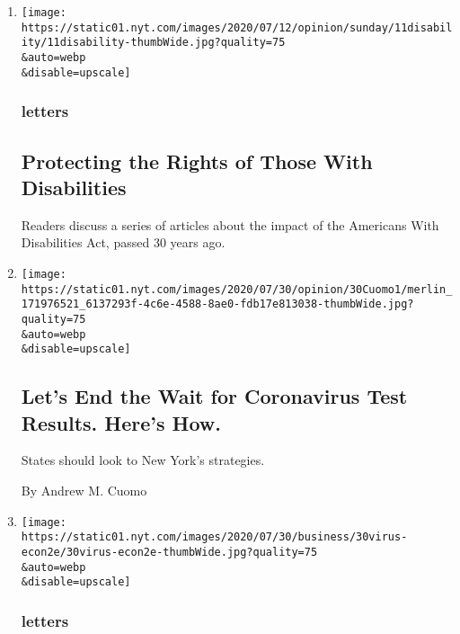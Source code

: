\begin{enumerate}
\def\labelenumi{\arabic{enumi}.}
\item
  \href{/2020/08/01/opinion/letters/disability-law.html}{}

  \texttt{[image: https://static01.nyt.com/images/2020/07/12/opinion/sunday/11disability/11disability-thumbWide.jpg?quality=75\\\&auto=webp\\\&disable=upscale]}

  \hypertarget{letters}{%
  \subsubsection{letters}\label{letters}}

  \hypertarget{protecting-the-rights-of-those-with-disabilities}{%
  \subsection{Protecting the Rights of Those With
  Disabilities}\label{protecting-the-rights-of-those-with-disabilities}}

  Readers discuss a series of articles about the impact of the Americans
  With Disabilities Act, passed 30 years ago.
\item
  \href{/2020/07/31/opinion/coronavirus-testing-cuomo.html}{}

  \texttt{[image: https://static01.nyt.com/images/2020/07/30/opinion/30Cuomo1/merlin\_171976521\_6137293f-4c6e-4588-8ae0-fdb17e813038-thumbWide.jpg?quality=75\\\&auto=webp\\\&disable=upscale]}

  \hypertarget{lets-end-the-wait-for-coronavirus-test-results-heres-how-1}{%
  \subsection{Let's End the Wait for Coronavirus Test Results. Here's
  How.}\label{lets-end-the-wait-for-coronavirus-test-results-heres-how-1}}

  States should look to New York's strategies.

  By Andrew M. Cuomo
\item
  \href{/2020/07/31/opinion/letters/coronavirus-economy.html}{}

  \texttt{[image: https://static01.nyt.com/images/2020/07/30/business/30virus-econ2e/30virus-econ2e-thumbWide.jpg?quality=75\\\&auto=webp\\\&disable=upscale]}

  \hypertarget{letters-1}{%
  \subsubsection{letters}\label{letters-1}}


\end{enumerate}
